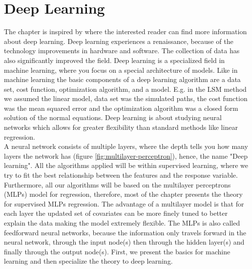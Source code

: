 
\chapter{Deep Learning} %

\label{Chapter4} %

The chapter is inspired by \parencite{Goodfellow-et-al-2016,Mackay18} where the interested reader can find more information about deep learning. Deep learning experiences a renaissance, because of the technology improvements in hardware and software. The collection of data has also significantly improved the field. Deep learning is a specialized field in machine learning, where you focus on a special architecture of models. Like in machine learning the basic components of a deep learning algorithm are a data set, cost function, optimization algorithm, and a model. E.g. in the LSM method we assumed the linear model, data set was the simulated paths, the cost function was the mean squared error and the optimization algorithm was a closed form solution of the normal equations. Deep learning is about studying neural networks which allows for greater flexibility than standard methods like linear regression. \\

A neural network consists of multiple layers, where the depth tells you how many layers the network has (figure \ref{fig:multilayer-perceptron}), hence, the name "Deep learning". All the algorithms applied will be within supervised learning, where we try to fit the best relationship between the features and the response variable. Furthermore, all our algorithms will be based on the multilayer perceptrons (MLPs) model for regression, therefore, most of the chapter presents the theory for supervised MLPs regression. The advantage of a multilayer model is that for each layer the updated set of covariates can be more finely tuned to better explain the data making the model extremely flexible. The MLPs is also called feedforward neural networks, because the information only travels forward in the neural network, through the input node(s) then through the hidden layer(s) and finally through the output node(s). First, we present the basics for machine learning and then specialize the theory to deep learning.


